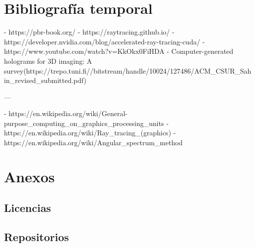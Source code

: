 \documentclass[10pt, a4paper]{article}
\begin{document}
\section*{Bibliografía temporal}

- https://pbr-book.org/
- https://raytracing.github.io/
- https://developer.nvidia.com/blog/accelerated-ray-tracing-cuda/
- https://www.youtube.com/watch?v=KkOkx0FiHDA
- Computer-generated holograms for 3D imaging: A survey(https://trepo.tuni.fi//bitstream/handle/10024/127486/ACM_CSUR_Sahin_revised_submitted.pdf)

---

- https://en.wikipedia.org/wiki/General-purpose_computing_on_graphics_processing_units
- https://en.wikipedia.org/wiki/Ray_tracing_(graphics)
- https://en.wikipedia.org/wiki/Angular_spectrum_method

\printbibliography[heading=bibintoc]

\section{Anexos}

\subsection{Licencias}

\subsection{Repositorios}
\end{document}
